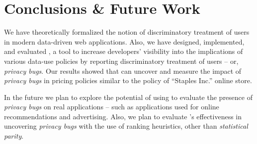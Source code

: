 \section{Conclusions \& Future Work}
\label{sect:conclusion}
We have theoretically formalized the notion of discriminatory treatment of
users in modern data-driven web applications.  Also, we have designed,
implemented, and evaluated \sysname, a tool to increase developers’ visibility
into the implications of various data-use policies by reporting discriminatory
treatment of users -- or, {\em privacy bugs}. Our results showed that \sysname
can uncover and measure the impact of {\em privacy bugs}
in pricing policies similar to the policy of ``Staples Inc.'' online store.

In the future we plan to explore the potential of using \sysname to evaluate
the presence of {\em privacy bugs} on real applications -- such as applications
used for online recommendations and advertising. Also, we plan to evaluate
\sysname's effectiveness in uncovering {\em privacy bugs} with the use of
ranking heuristics, other than {\em statistical parity}.
